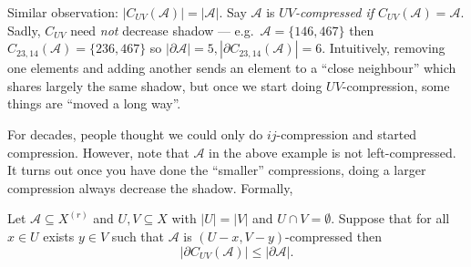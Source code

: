 \documentclass[a4paper]{article}
\newcommand{\shadow}{\partial}
\begin{document}
Similar observation: \(|C_{UV}(\mathcal A)| = |\mathcal A|\). Say \(\mathcal A\) is \emph{\(UV\)-compressed if \(C_{UV}(\mathcal A) =\mathcal A\)}. Sadly, \(C_{UV}\) need \emph{not} decrease shadow --- e.g.\ \(\mathcal A = \{146, 467\}\) then \(C_{23, 14}(\mathcal A) = \{236, 467\}\) so \(|\shadow \mathcal A| = 5, |\shadow C_{23, 14}(\mathcal A)| = 6\). Intuitively, removing one elements and adding another sends an element to a ``close neighbour'' which shares largely the same shadow, but once we start doing \(UV\)-compression, some things are ``moved a long way''.

For decades, people thought we could only do \(ij\)-compression and started compression. However, note that \(\mathcal A\) in the above example is not left-compressed. It turns out once you have done the ``smaller'' compressions, doing a larger compression always decrease the shadow. Formally,

\begin{proposition}
  Let \(\mathcal A \subseteq X^{(r)}\) and \(U,V \subseteq X\) with \(|U| = |V|\) and \(U \cap V = \emptyset\). Suppose that for all \(x \in U\) exists \(y \in V\) such that \(\mathcal A\) is \((U - x, V - y)\)-compressed then
  \[
    |\shadow C_{UV}(\mathcal A)| \leq |\shadow \mathcal A|.
  \]
\end{proposition}









\printindex
\end{document}
